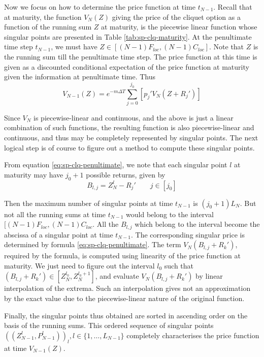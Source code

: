Now we focus on how to determine the price function at time $ t_{N - 1} $. Recall that at maturity, the function $ V_{N}(Z) $ giving the price of the cliquet option as a function of the running sum $ Z $ at maturity, is the piecewise linear function whose singular points are presented in Table \ref{tab:sp-clq-maturity}. At the penultimate time step $ t_{N - 1} $, we must have $ Z \in [ (N-1) F_{loc}, (N-1) C_{loc} ] $. Note that $ Z $ is the running sum till the penultimate time step. The price function at this time is given as a discounted conditional expectation of the price function at maturity given the information at penultimate time. Thus
\begin{equation}
	\label{eq:sp-clq-penultimate}
	V_{N-1} (Z) = e^{- m \Delta T} \sum_{j=0}^{j_0} \left[ p_j' V_{N} (Z + R_j') \right]
\end{equation}

Since $ V_{N} $ is piecewise-linear and continuous, and the above is just a linear combination of such functions, the resulting function is also piecewise-linear and continuous, and thus may be completely represented by singular points. The next logical step is of course to figure out a method to compute these singular points.

From equation \ref{eq:sp-clq-penultimate}, we note that each singular point $ l $ at maturity may have $ j_0 + 1 $ possible returns, given by
\begin{equation}
	\label{eq:sp-clq-b}
	B_{l,j} = Z_N^l - R_j' \qquad j \in [j_0]
\end{equation}

Then the maximum number of singular points at time $ t_{N-1} $ is $ ( j_0 + 1 ) L_N $. But not all the running sums at time $ t_{N-1} $ would belong to the interval $ [ (N-1) F_{loc}, (N-1) C_{loc} $. All the $ B_{l,j} $ which belong to the interval become the abscissa of a singular point at time $ t_{N-1} $. The corresponding singular price is determined by formula \ref{eq:sp-clq-penultimate}. The term $ V_{N} (B_{l,j} + R_k') $, required by the formula, is computed using linearity of the price function at maturity. We just need to figure out the interval $ l_0 $ such that $ ( B_{l,j} + R_k' ) \in [ Z_N^{l_0}, Z_N^{l_0 + 1} ] $, and evaluate $ V_{N} (B_{l,j} + R_k') $ by linear interpolation of the extrema. Such an interpolation gives not an approximation by the exact value due to the piecewise-linear nature of the original function.

Finally, the singular points thus obtained are sorted in ascending order on the basis of the running sums. This ordered sequence of singular points $ ( ( Z_{N-1}^l, P_{N-1}^l ) )_l , l \in \{ 1, \dots, L_{N-1} \} $ completely characterises the price function at time $ V_{N-1}(Z) $.


